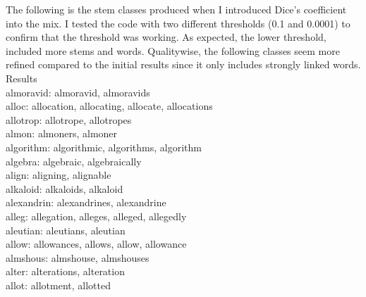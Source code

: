 \documentclass[10pt,letterpaper,bibliography=totoc]{scrartcl}
\begin{document}
The following is the stem classes produced when I introduced Dice's coefficient into the mix. I tested the code with two different thresholds (0.1 and 0.0001) to confirm that the threshold was working. As expected, the lower threshold, included more stems and words. Qualitywise, the following classes seem more refined compared to the initial results since it only includes strongly linked words. 
 Results\\
almoravid: almoravid, almoravids\\
alloc: allocation, allocating, allocate, allocations\\
allotrop: allotrope, allotropes\\
almon: almoners, almoner\\
algorithm: algorithmic, algorithms, algorithm\\
algebra: algebraic, algebraically\\
align: aligning, alignable\\
alkaloid: alkaloids, alkaloid\\
alexandrin: alexandrines, alexandrine\\
alleg: allegation, alleges, alleged, allegedly\\
aleutian: aleutians, aleutian\\
allow: allowances, allows, allow, allowance\\
almshous: almshouse, almshouses\\
alter: alterations, alteration\\
allot: allotment, allotted\\
\end{document}

